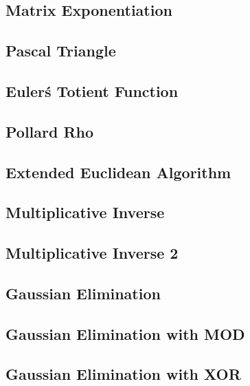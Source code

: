 \subsection{Matrix Exponentiation}
\raggedbottom
\hrulefill
\subsection{Pascal Triangle}
\raggedbottom
\hrulefill
\subsection{Euler\'s Totient Function}
\raggedbottom
\hrulefill
\subsection{Pollard Rho}
\raggedbottom
\hrulefill
\subsection{Extended Euclidean Algorithm}
\raggedbottom
\hrulefill
\subsection{Multiplicative Inverse}
\raggedbottom
\hrulefill
\subsection{Multiplicative Inverse 2}
\raggedbottom
\hrulefill
\subsection{Gaussian Elimination}
\raggedbottom
\hrulefill
\subsection{Gaussian Elimination with MOD}
\raggedbottom
\hrulefill
\subsection{Gaussian Elimination with XOR}
\raggedbottom
\hrulefill
